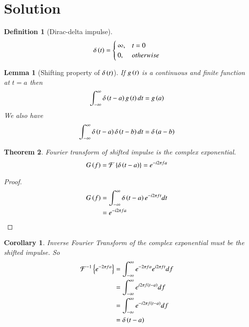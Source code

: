 \documentclass[journal,12pt,twocolumn]{IEEEtran}
\newtheorem{theorem}{Theorem}[section]
\newtheorem{corollary}{Corollary}[theorem]
\newtheorem{lemma}[theorem]{Lemma}
\newtheorem{definition}{Definition}[section]
\begin{document}
\section{Solution}
\begin{definition}[Dirac-delta impulse]
\begin{align}
 \delta\left(t\right)=
 \begin{cases}
 \infty , & t=0\\
 0, & otherwise
 \end{cases}
\end{align}
\end{definition}
\begin{lemma}[Shifting property of $\delta\left(t\right)$]
 If $g\left(t\right)$ is a continuous and finite function at $t=a$ then
 \begin{align}
     \int_{-\infty}^{\infty}\delta\left(t-a\right)g\left(t\right)dt=g\left(a\right)
 \end{align}
 We also have
 \begin{align}
     \int_{-\infty}^{\infty}\delta\left(t-a\right)\delta\left(t-b\right)dt=\delta\left(a-b\right)\label{translation}
 \end{align}
\end{lemma}
\begin{theorem}
Fourier transform of shifted impulse is the complex exponential.
\begin{align}
    G\left(f\right)=\mathcal{F}\left\{\delta\left(t-a\right)\right\}=e^{-i2\pi fa}
\end{align}
\end{theorem}
\begin{proof}
 \begin{align}
     G\left(f\right)&=\int_{-\infty}^{\infty}\delta\left(t-a\right)e^{-i2\pi ft}dt\\
     &=e^{-i2\pi fa}
 \end{align}
\end{proof}
\begin{corollary}
Inverse Fourier Transform of the complex exponential must be the shifted impulse. So
\begin{align}
    \mathcal{F}^{-1}\left\{e^{-2\pi fa}\right\}&=\int_{-\infty}^{\infty}e^{-2\pi fa}e^{i2\pi ft}df\\
    &=\int_{-\infty}^{\infty}e^{i2\pi f\left(t-a\right)}df\\
    &=\int_{-\infty}^{\infty}e^{-i2\pi f\left(t-a\right)}df\\
    &=\delta\left(t-a\right)
\end{align}
\end{corollary}
\end{document}

